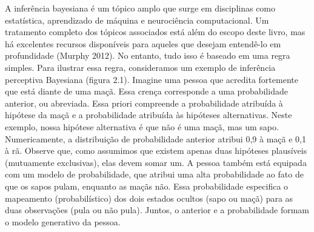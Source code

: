 \documentclass[
  12pt,
]{book}
\begin{document}
A inferência bayesiana é um tópico amplo que surge em disciplinas como estatística, aprendizado de máquina e neurociência computacional. Um tratamento completo dos tópicos associados está além do escopo deste livro, mas há excelentes recursos disponíveis para aqueles que desejam entendê-lo em profundidade (Murphy 2012). No entanto, tudo isso é baseado em uma regra simples. Para ilustrar essa regra, consideramos um exemplo de inferência perceptiva Bayesiana (figura 2.1). Imagine uma pessoa que acredita fortemente que está diante de uma maçã. Essa crença corresponde a uma probabilidade anterior, ou abreviada. Essa priori compreende a probabilidade atribuída à hipótese da maçã e a probabilidade atribuída às hipóteses alternativas. Neste exemplo, nossa hipótese alternativa é que não é uma maçã, mas um sapo. Numericamente, a distribuição de probabilidade anterior atribui 0,9 à maçã e 0,1 à rã. Observe que, como assumimos que existem apenas duas hipóteses plausíveis (mutuamente exclusivas), elas devem somar um. A pessoa também está equipada com um modelo de probabilidade, que atribui uma alta probabilidade ao fato de que os sapos pulam, enquanto as maçãs não. Essa probabilidade especifica o mapeamento (probabilístico) dos dois estados ocultos (sapo ou maçã) para as duas observações (pula ou não pula). Juntos, o anterior e a probabilidade formam o modelo generativo da pessoa.
\end{document}

